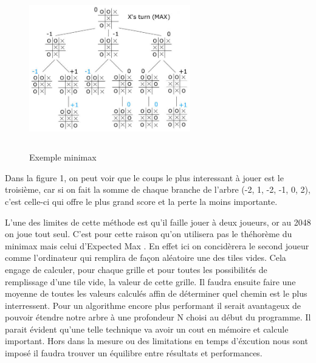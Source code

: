 \documentclass{article}
\begin{document}
\begin{figure}[!h]
   \includegraphics[width=7cm,height=7cm]{minimax.jpg}
   \caption{\label{minimax} Exemple minimax}
\end{figure}

Dans la figure 1, on peut voir que le coups le plus interessant à jouer est le troisi\`eme, car si on fait la somme de chaque branche de l'arbre (-2, 1, -2, -1, 0, 2), c'est celle-ci qui offre le plus grand score et la perte la moins importante.

L'une des limites de cette m\'ethode est qu'il faille jouer \`a deux joueurs, or au 2048 on joue tout seul. C'est pour cette raison qu'on utilisera pas le th\'ehor\`eme du \og minimax \fg{} mais celui d'\og Expected Max \fg{}. En effet ici on concid\`erera le second joueur comme l'ordinateur qui remplira de façon aléatoire une des tiles vides. Cela engage de calculer, pour chaque grille et pour toutes les possibilit\'es de remplissage d'une tile vide, la valeur de cette grille. Il faudra ensuite faire une moyenne de toutes les valeurs calculés affin de déterminer quel chemin est le plus interressent. Pour un algorithme encore plus performant il serait avantageux de pouvoir \'etendre notre arbre \`a une profondeur N choisi au d\'ebut du programme. Il parait évident qu'une telle technique va avoir un cout en mémoire et calcule important. Hors dans la mesure ou des limitations en temps d'éxcution nous sont imposé il faudra trouver un équilibre entre résultats et performances.
\end{document}
